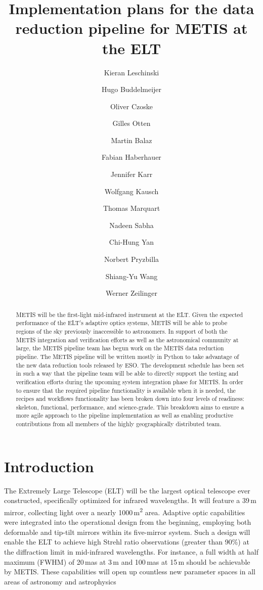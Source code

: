 \documentclass[a4paper]{spie}  %
\title{Implementation plans for the data reduction pipeline for METIS at the ELT}
\author[a]{Kieran Leschinski}
\author[a]{Hugo Buddelmeijer}
\author[a]{Oliver Czoske}
\author[b]{Gilles Otten}
\author[a]{Martin Balaz}
\author[a]{Fabian Haberhauer}
\author[b]{Jennifer Karr}
\author[c]{Wolfgang Kausch}
\author[d]{Thomas Marquart}
\author[c]{Nadeen Sabha}
\author[b]{Chi-Hung Yan}
\author[c]{Norbert Pryzbilla}
\author[b]{Shiang-Yu Wang}
\author[a]{Werner Zeilinger}
\affil[a]{University of Vienna, 1180 Vienna, Austria}     %
\affil[b]{Academia Sinica, Institute of Astronomy and Astrophysics, Taipei 10617, Taiwan}       %
\affil[c]{Institut f\"ur Astro- und Teilchenphysik, Universit\"at Innsbruck, 6020 Innsbruck, Austria}   %
\affil[d]{University of Uppsala, 751 20 Uppsala, Sweden}   %
\begin{document}
 
\maketitle

\begin{abstract}
METIS will be the first-light mid-infrared instrument at the ELT.
Given the expected performance of the ELT's adaptive optics systems, METIS will be able to probe regions of the sky previously inaccessible to astronomers.
In support of both the METIS integration and verification efforts as well as the astronomical community at large, the METIS pipeline team has begun work on the METIS data reduction pipeline.
The METIS pipeline will be written mostly in Python to take advantage of the new data reduction tools released by ESO.
The development schedule has been set in such a way that the pipeline team will be able to directly support the testing and verification efforts during the upcoming system integration phase for METIS.
In order to ensure that the required pipeline functionality is available when it is needed, the recipes and workflows functionality has been broken down into four levels of readiness: skeleton, functional, performance, and science-grade. 
This breakdown aims to ensure a more agile approach to the pipeline implementation as well as enabling productive contributions from all members of the highly geographically distributed team.





\end{abstract}



\section{Introduction}
The Extremely Large Telescope (ELT) will be the largest optical telescope ever constructed, specifically optimized for infrared wavelengths. 
It will feature a 39\,m mirror, collecting light over a nearly 1000\,m\textsuperscript{2} area. 
Adaptive optic capabilities were integrated into the operational design from the beginning, employing both deformable and tip-tilt mirrors within its five-mirror system. 
Such a design will enable the ELT to achieve high Strehl ratio observations (greater than 90\%) at the diffraction limit in mid-infrared wavelengths. 
For instance, a full width at half maximum (FWHM) of 20\,mas at 3\,\textmu m and 100\,mas at 15\,\textmu m should be achievable by METIS. 
These capabilities will open up countless new parameter spaces in all areas of astronomy and astrophysics
\end{document}
